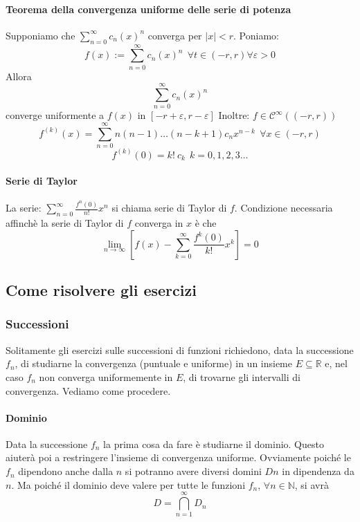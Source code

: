 \documentclass[a4paper,12pt]{article}
\newcommand{\cont}{\mathscr{C}}
\begin{document}
\paragraph{Teorema della convergenza uniforme delle serie di potenza}
Supponiamo che $ \displaystyle \sum_{n=0}^\infty c_n\left(x\right)^n$ converga per $|x|<r$. Poniamo:
$$ f(x):= \displaystyle \sum_{n=0}^\infty c_n\left(x\right)^n \ \ \forall t \in (-r,r) \forall \varepsilon > 0 $$
Allora $$ \displaystyle \sum_{n=0}^\infty c_n\left(x\right)^n$$ converge uniformente a $f(x)$ in $[-r+\varepsilon,r-\varepsilon]$ Inoltre: $f \in \cont^\infty((-r,r))$ $$f^{(k)}(x) = \displaystyle \sum_{n=0}^\infty n(n-1)\dots(n-k+1)c_n x^{n-k} \ \ \forall x \in (-r,r)$$  $$f^{(k)}(0) = k!\ c_k \ \ k=0,1,2,3 \dots $$ 

\paragraph{Serie di Taylor}
La serie:
$\displaystyle \sum_{n=0}^\infty \frac{f^{n}(0)}{n!} x^n$ si chiama serie di Taylor di $f$. Condizione necessaria affinchè la serie di Taylor di $f$ converga in  $x$ è che $$\lim_{n \to \infty}\displaystyle \left[ f(x) - \displaystyle  \sum_{k=0}^\infty \frac{f^{k}(0)}{k!}x^k \right] = 0 $$


\subsection{Come risolvere gli esercizi}

\subsubsection{Successioni}
Solitamente gli esercizi sulle successioni di funzioni richiedono, data la successione ${f_n}$, di studiarne la convergenza (puntuale e uniforme) in un insieme $E\subseteq \mathbb{R}$ e, nel caso $f_n$ non converga uniformemente in $E$, di trovarne gli intervalli di convergenza. Vediamo come procedere.
\paragraph*{Dominio}
Data la successione ${f_n}$ la prima cosa da fare è studiarne il dominio. Questo aiuterà poi a restringere l'insieme di convergenza uniforme. Ovviamente poiché le $f_n$ dipendono anche dalla $n$ si potranno avere diversi domini $Dn$ in dipendenza da $n$. Ma poiché il dominio deve valere per tutte le funzioni $f_n$, $\forall n\in\mathbb{N}$, si avrà
$$D=\displaystyle\bigcap_{n=1}^{\infty} D_n$$
\end{document}
